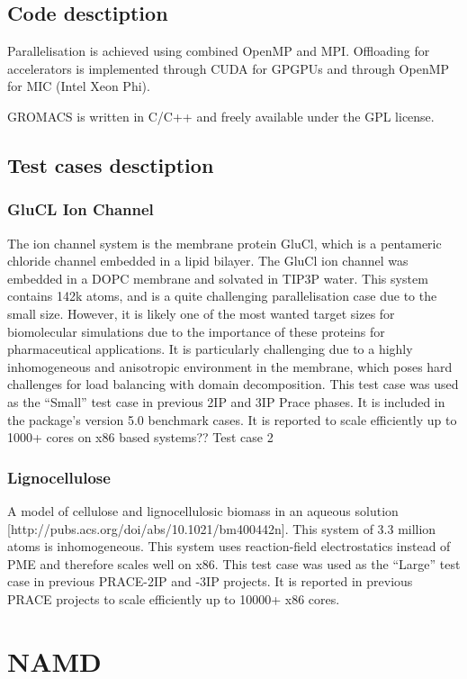 \subsection{Code desctiption}
Parallelisation is achieved using combined OpenMP and MPI.
Offloading for accelerators is implemented through CUDA for GPGPUs and through OpenMP for MIC (Intel Xeon Phi).

GROMACS is written in C/C++ and freely available under the GPL license.

\subsection{Test cases desctiption}

\subsubsection{GluCL Ion Channel}
The ion channel system is the membrane protein GluCl, which is a pentameric chloride channel embedded in a lipid bilayer. The GluCl ion channel was embedded in a DOPC membrane and solvated in TIP3P water. This system contains 142k atoms, and is a quite challenging parallelisation case due to the small size. However, it is likely one of the most wanted target sizes for biomolecular simulations due to the importance of these proteins for pharmaceutical applications. It is particularly challenging due to a highly inhomogeneous and anisotropic environment in the membrane, which poses hard challenges for load balancing with domain decomposition.
This test case was used as the “Small” test case in previous 2IP and 3IP Prace phases. It is included in the package's version 5.0 benchmark cases. It is reported to scale efficiently up to 1000+ cores on x86 based systems??
Test case 2

\subsubsection{Lignocellulose}
A model of cellulose and lignocellulosic biomass in an aqueous solution [http://pubs.acs.org/doi/abs/10.1021/bm400442n]. This system of 3.3 million atoms is inhomogeneous. This system uses reaction-field electrostatics instead of PME and therefore scales well on x86. This test case was used as the “Large” test case in previous PRACE-2IP and -3IP projects. It is reported in previous PRACE projects to scale efficiently up to 10000+ x86 cores.

\section{NAMD}

